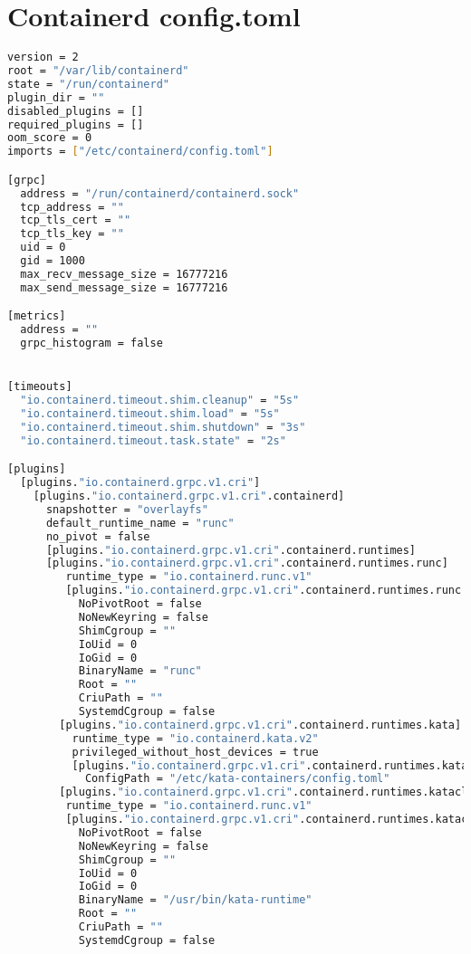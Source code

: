 \section{Containerd config.toml}
\hfill \newline
\label{app:containerd_config}
\begin{lstlisting}[language=bash]
version = 2
root = "/var/lib/containerd"
state = "/run/containerd"
plugin_dir = ""
disabled_plugins = []
required_plugins = []
oom_score = 0
imports = ["/etc/containerd/config.toml"]

[grpc]
  address = "/run/containerd/containerd.sock"
  tcp_address = ""
  tcp_tls_cert = ""
  tcp_tls_key = ""
  uid = 0
  gid = 1000
  max_recv_message_size = 16777216
  max_send_message_size = 16777216

[metrics]
  address = ""
  grpc_histogram = false


[timeouts]
  "io.containerd.timeout.shim.cleanup" = "5s"
  "io.containerd.timeout.shim.load" = "5s"
  "io.containerd.timeout.shim.shutdown" = "3s"
  "io.containerd.timeout.task.state" = "2s"

[plugins]
  [plugins."io.containerd.grpc.v1.cri"]
    [plugins."io.containerd.grpc.v1.cri".containerd]
      snapshotter = "overlayfs"
      default_runtime_name = "runc"
      no_pivot = false
      [plugins."io.containerd.grpc.v1.cri".containerd.runtimes]
      [plugins."io.containerd.grpc.v1.cri".containerd.runtimes.runc]
         runtime_type = "io.containerd.runc.v1"
         [plugins."io.containerd.grpc.v1.cri".containerd.runtimes.runc.options]
           NoPivotRoot = false
           NoNewKeyring = false
           ShimCgroup = ""
           IoUid = 0
           IoGid = 0
           BinaryName = "runc"
           Root = ""
           CriuPath = ""
           SystemdCgroup = false
        [plugins."io.containerd.grpc.v1.cri".containerd.runtimes.kata]
          runtime_type = "io.containerd.kata.v2"
          privileged_without_host_devices = true
          [plugins."io.containerd.grpc.v1.cri".containerd.runtimes.kata.options]
            ConfigPath = "/etc/kata-containers/config.toml"
        [plugins."io.containerd.grpc.v1.cri".containerd.runtimes.katacli]
         runtime_type = "io.containerd.runc.v1"
         [plugins."io.containerd.grpc.v1.cri".containerd.runtimes.katacli.options]
           NoPivotRoot = false
           NoNewKeyring = false
           ShimCgroup = ""
           IoUid = 0
           IoGid = 0
           BinaryName = "/usr/bin/kata-runtime"
           Root = ""
           CriuPath = ""
           SystemdCgroup = false
\end{lstlisting}

